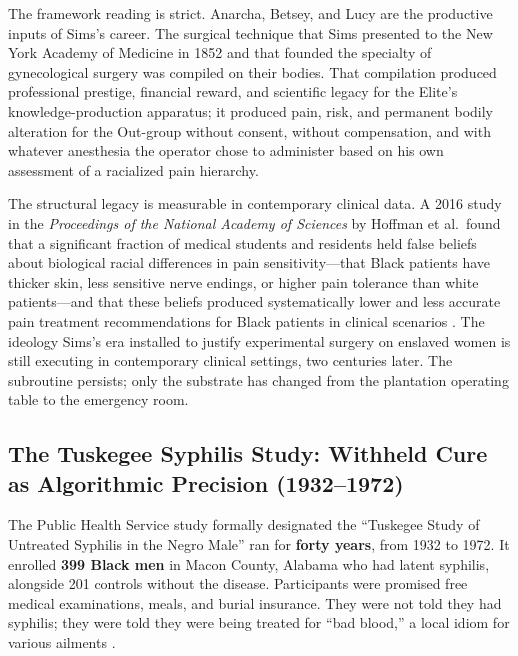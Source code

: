 The framework reading is strict. Anarcha, Betsey, and Lucy are the productive inputs of Sims's career. The surgical technique that Sims presented to the New York Academy of Medicine in 1852 and that founded the specialty of gynecological surgery was compiled on their bodies. That compilation produced professional prestige, financial reward, and scientific legacy for the Elite's knowledge-production apparatus; it produced pain, risk, and permanent bodily alteration for the Out-group without consent, without compensation, and with whatever anesthesia the operator chose to administer based on his own assessment of a racialized pain hierarchy.

The structural legacy is measurable in contemporary clinical data. A 2016 study in the \textit{Proceedings of the National Academy of Sciences} by Hoffman et al.\ found that a significant fraction of medical students and residents held false beliefs about biological racial differences in pain sensitivity---that Black patients have thicker skin, less sensitive nerve endings, or higher pain tolerance than white patients---and that these beliefs produced systematically lower and less accurate pain treatment recommendations for Black patients in clinical scenarios \cite{hoffman_pain_disparity}. The ideology Sims's era installed to justify experimental surgery on enslaved women is still executing in contemporary clinical settings, two centuries later. The subroutine persists; only the substrate has changed from the plantation operating table to the emergency room.

\subsection{The Tuskegee Syphilis Study: Withheld Cure as Algorithmic Precision (1932--1972)}
\label{subsec:tuskegee}

The Public Health Service study formally designated the ``Tuskegee Study of Untreated Syphilis in the Negro Male'' ran for \textbf{forty years}, from 1932 to 1972. It enrolled \textbf{399 Black men} in Macon County, Alabama who had latent syphilis, alongside 201 controls without the disease. Participants were promised free medical examinations, meals, and burial insurance. They were not told they had syphilis; they were told they were being treated for ``bad blood,'' a local idiom for various ailments \cite{jones_bad_blood, reverby_tuskegee}.

